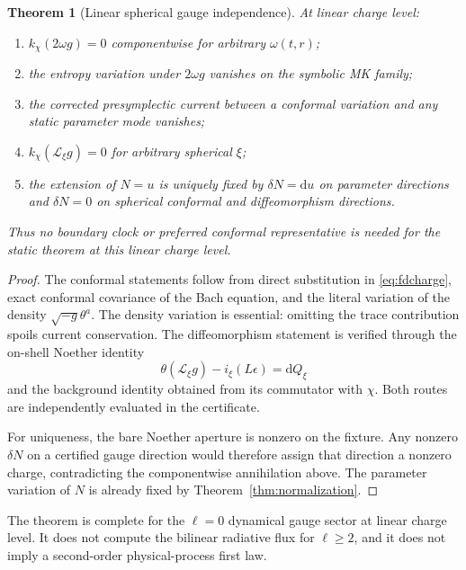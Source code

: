 \documentclass[11pt]{article}
\newtheorem{theorem}{Theorem}[section]
\theoremstyle{definition}
\theoremstyle{remark}
\newcommand{\dd}{\mathrm d}
\newcommand{\Lie}{\mathcal L}
\begin{document}
\begin{theorem}[Linear spherical gauge independence]
\label{thm:l0}
At linear charge level:
\begin{enumerate}
\item \(k_\chi(2\omega g)=0\) componentwise for arbitrary \(\omega(t,r)\);
\item the entropy variation under \(2\omega g\) vanishes on the symbolic
      MK family;
\item the corrected presymplectic current between a conformal variation and
      any static parameter mode vanishes;
\item \(k_\chi(\Lie_\xi g)=0\) for arbitrary spherical \(\xi\);
\item the extension of \(N=u\) is uniquely fixed by
      \(\delta N=\dd u\) on parameter directions and \(\delta N=0\) on
      spherical conformal and diffeomorphism directions.
\end{enumerate}
Thus no boundary clock or preferred conformal representative is needed for
the static theorem at this linear charge level.
\end{theorem}

\begin{proof}
The conformal statements follow from direct substitution in
\eqref{eq:fdcharge}, exact conformal covariance of the Bach equation, and
the literal variation of the density \(\sqrt{-g}\theta^a\).  The density
variation is essential: omitting the trace contribution spoils current
conservation.  The diffeomorphism statement is verified through the
on-shell Noether identity
\begin{equation}
 \theta(\Lie_\xi g)-i_\xi(L\epsilon)=\dd Q_\xi
\end{equation}
and the background identity obtained from its commutator with \(\chi\).
Both routes are independently evaluated in the certificate.

For uniqueness, the bare Noether aperture is nonzero on the fixture.  Any
nonzero \(\delta N\) on a certified gauge direction would therefore assign
that direction a nonzero charge, contradicting the componentwise
annihilation above.  The parameter variation of \(N\) is already fixed by
Theorem~\ref{thm:normalization}.
\end{proof}

The theorem is complete for the \(\ell=0\) dynamical gauge sector at linear
charge level.  It does not compute the bilinear radiative flux for
\(\ell\ge2\), and it does not imply a second-order physical-process first
law.
\end{document}
